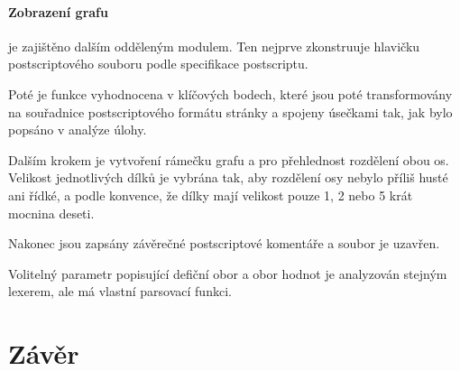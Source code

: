 \documentclass[11pt]{article}
\begin{document}
\paragraph{Zobrazení grafu}
je zajištěno dalším odděleným modulem. Ten nejprve zkonstruuje hlavičku
postscriptového souboru podle specifikace postscriptu. 

Poté je funkce vyhodnocena v klíčových bodech, které jsou poté transformovány
na souřadnice postscriptového formátu stránky a spojeny úsečkami tak, jak bylo
popsáno v analýze úlohy. 

Dalším krokem je vytvoření rámečku grafu a pro přehlednost rozdělení obou os.
Velikost jednotlivých dílků je vybrána tak, aby rozdělení osy nebylo příliš
husté ani řídké, a podle konvence, že dílky mají velikost pouze 1, 2 nebo 5
krát mocnina deseti.

Nakonec jsou zapsány závěrečné postscriptové komentáře a soubor je uzavřen.


Volitelný parametr popisující defiční obor a obor hodnot je analyzován stejným
lexerem, ale má vlastní parsovací funkci.


\section{Závěr}
\end{document}

